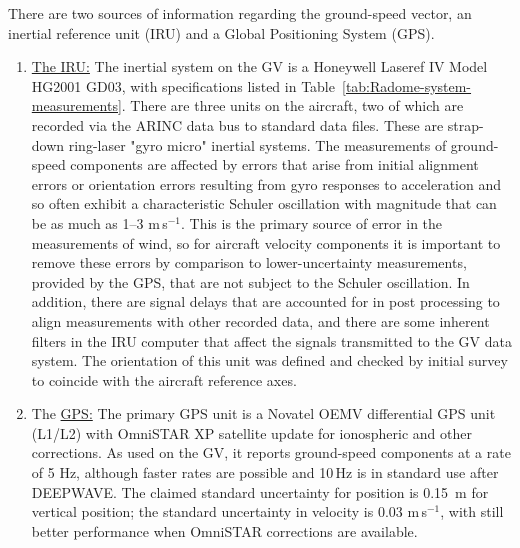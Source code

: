 \documentclass[12pt,twoside,english]{article}\usepackage[]{graphicx}\usepackage[]{color}
\let\OrgIndex\index
\renewcommand*{\index}[1]{\OrgIndex{#1}}
\begin{document}
There are two sources of information regarding the ground-speed vector, an inertial reference unit (IRU) and a Global Positioning System (GPS).  
\begin{enumerate}
\item \uline{The IRU:} The inertial system on the GV is a Honeywell Laseref IV Model HG2001 GD03, with specifications listed in Table~\ref{tab:Radome-system-measurements}.  There are three units on the aircraft, two of which are recorded via the ARINC data bus to standard data files. These are strap-down ring-laser "gyro micro" inertial systems. The measurements of ground-speed components are affected by errors that arise from initial alignment errors or orientation errors resulting from gyro responses to acceleration and so often exhibit a characteristic Schuler oscillation with magnitude that can be as much as 1--3 m\,s$^{-1}$. This is the primary source of error in the measurements of wind, so for aircraft velocity components it is important to remove these errors by comparison to lower-uncertainty measurements, provided by the GPS, that are not subject to the Schuler oscillation. In addition, there are signal delays that are accounted for in post processing to align measurements with other recorded data, and there are some inherent filters in the IRU computer that affect the signals transmitted to the GV data system. The orientation of this unit was defined and checked by initial survey to coincide with the aircraft reference axes.  
\item The \uline{GPS:} The primary GPS
unit is a Novatel OEMV differential GPS unit (L1/L2) with OmniSTAR XP satellite update for ionospheric and other corrections. As used on the GV, it reports ground-speed components at a rate of 5 Hz, although faster rates are possible and 10\,Hz is in standard use after DEEPWAVE. The claimed standard uncertainty for position is 0.15~m for vertical position; the standard uncertainty in velocity is 0.03 m\,s$^{-1}$, with still better
performance  when OmniSTAR corrections are available.
\end{enumerate}
\end{document}
